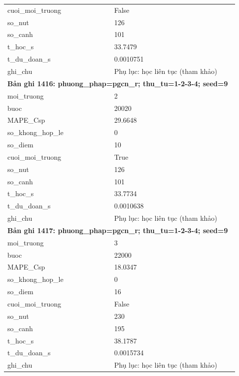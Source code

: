 \begin{longtable}{p{0.43\linewidth}p{0.50\linewidth}}
cuoi\_\allowbreak moi\_\allowbreak truong & False \\
so\_\allowbreak nut & 126 \\
so\_\allowbreak canh & 101 \\
t\_\allowbreak hoc\_\allowbreak s & 33.7479 \\
t\_\allowbreak du\_\allowbreak doan\_\allowbreak s & 0.0010751 \\
ghi\_\allowbreak chu & Phụ lục: học liên tục (tham khảo) \\
\midrule
\multicolumn{2}{p{0.95\linewidth}}{\textbf{Bản ghi 1416: phuong\_phap=pgcn\_r; thu\_tu=1-2-3-4; seed=9}} \\
moi\_\allowbreak truong & 2 \\
buoc & 20020 \\
MAPE\_\allowbreak Csp & 29.6648 \\
so\_\allowbreak khong\_\allowbreak hop\_\allowbreak le & 0 \\
so\_\allowbreak diem & 10 \\
cuoi\_\allowbreak moi\_\allowbreak truong & True \\
so\_\allowbreak nut & 126 \\
so\_\allowbreak canh & 101 \\
t\_\allowbreak hoc\_\allowbreak s & 33.7734 \\
t\_\allowbreak du\_\allowbreak doan\_\allowbreak s & 0.0010638 \\
ghi\_\allowbreak chu & Phụ lục: học liên tục (tham khảo) \\
\midrule
\multicolumn{2}{p{0.95\linewidth}}{\textbf{Bản ghi 1417: phuong\_phap=pgcn\_r; thu\_tu=1-2-3-4; seed=9}} \\
moi\_\allowbreak truong & 3 \\
buoc & 22000 \\
MAPE\_\allowbreak Csp & 18.0347 \\
so\_\allowbreak khong\_\allowbreak hop\_\allowbreak le & 0 \\
so\_\allowbreak diem & 16 \\
cuoi\_\allowbreak moi\_\allowbreak truong & False \\
so\_\allowbreak nut & 230 \\
so\_\allowbreak canh & 195 \\
t\_\allowbreak hoc\_\allowbreak s & 38.1787 \\
t\_\allowbreak du\_\allowbreak doan\_\allowbreak s & 0.0015734 \\
ghi\_\allowbreak chu & Phụ lục: học liên tục (tham khảo) \\

\end{longtable}
